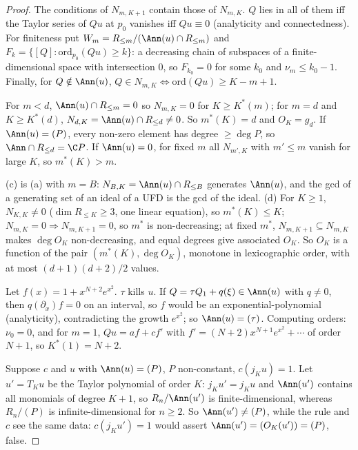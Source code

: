 \begin{proof}
The conditions of $N_{m,K+1}$ contain those of $N_{m,K}$. $Q$ lies in all of them iff the Taylor series of $Qu$ at $p_0$ vanishes iff $Qu\equiv0$ (analyticity and connectedness). For finiteness put $W_m=R_{\le m}/(\Ann(u)\cap R_{\le m})$ and $F_k=\{[Q]:\mathrm{ord}_{p_0}(Qu)\ge k\}$: a decreasing chain of subspaces of a finite-dimensional space with intersection $0$, so $F_{k_0}=0$ for some $k_0$ and $\nu_m\le k_0-1$. Finally, for $Q\notin\Ann(u)$, $Q\in N_{m,K}\iff\mathrm{ord}(Qu)\ge K-m+1$.

For $m<d$, $\Ann(u)\cap R_{\le m}=0$ so $N_{m,K}=0$ for $K\ge K^*(m)$; for $m=d$ and $K\ge K^*(d)$, $N_{d,K}=\Ann(u)\cap R_{\le d}\ne0$. So $m^*(K)=d$ and $O_K=g_d$. If $\Ann(u)=(P)$, every non-zero element has degree $\ge\deg P$, so $\Ann\cap R_{\le d}=\C P$. If $\Ann(u)=0$, for fixed $m$ all $N_{m',K}$ with $m'\le m$ vanish for large $K$, so $m^*(K)>m$.

(c) is (a) with $m=B$: $N_{B,K}=\Ann(u)\cap R_{\le B}$ generates $\Ann(u)$, and the gcd of a generating set of an ideal of a UFD is the gcd of the ideal. (d) For $K\ge1$, $N_{K,K}\ne0$ ($\dim R_{\le K}\ge3$, one linear equation), so $m^*(K)\le K$; $N_{m,K}=0\Rightarrow N_{m,K+1}=0$, so $m^*$ is non-decreasing; at fixed $m^*$, $N_{m,K+1}\subseteq N_{m,K}$ makes $\deg O_K$ non-decreasing, and equal degrees give associated $O_K$. So $O_K$ is a function of the pair $(m^*(K),\deg O_K)$, monotone in lexicographic order, with at most $(d+1)(d+2)/2$ values.

Let $f(x)=1+x^{N+2}e^{x^2}$. $\tau$ kills $u$. If $Q=\tau Q_1+q(\xi)\in\Ann(u)$ with $q\ne0$, then $q(\partial_x)f=0$ on an interval, so $f$ would be an exponential-polynomial (analyticity), contradicting the growth $e^{x^2}$; so $\Ann(u)=(\tau)$. Computing orders: $\nu_0=0$, and for $m=1$, $Qu=af+cf'$ with $f'=(N+2)x^{N+1}e^{x^2}+\cdots$ of order $N+1$, so $K^*(1)=N+2$.

Suppose $c$ and $u$ with $\Ann(u)=(P)$, $P$ non-constant, $c(j_Ku)=1$. Let $u'=T_Ku$ be the Taylor polynomial of order $K$: $j_Ku'=j_Ku$ and $\Ann(u')$ contains all monomials of degree $K+1$, so $R_n/\Ann(u')$ is finite-dimensional, whereas $R_n/(P)$ is infinite-dimensional for $n\ge2$. So $\Ann(u')\ne(P)$, while the rule and $c$ see the same data: $c(j_Ku')=1$ would assert $\Ann(u')=(O_K(u'))=(P)$, false.

\end{proof}

